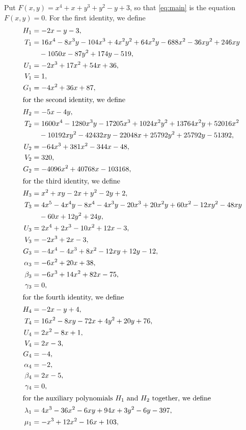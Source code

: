 \documentclass[11pt]{article}
\begin{document}
Put $F(x,y)=x^{4}+x+y^{3}+y^{2}-y+3$, so that \eqref{eq:main} is the equation $F(x,y)=0$. For the first identity, we define
\begin{align*}
H_{1}&=-2x-y-3,\\
T_{1}&=16x^{4}-8x^{3}y-104x^{3}+4x^{2}y^{2}+64x^{2}y-688x^{2}-36xy^{2}+246xy\\
&\quad-1050x-87y^{2}+174y-519,\\
U_{1}&=-2x^{3}+17x^{2}+54x+36,\\
V_{1}&=1,\\
G_{1}&=-4x^{2}+36x+87,\\
\intertext{for the second identity, we define}
H_{2}&=-5x-4y,\\
T_{2}&=1600x^{4}-1280x^{3}y-17205x^{3}+1024x^{2}y^{2}+13764x^{2}y+52016x^{2}\\
&\quad-10192xy^{2}-42432xy-22048x+25792y^{2}+25792y-51392,\\
U_{2}&=-64x^{3}+381x^{2}-344x-48,\\
V_{2}&=320,\\
G_{2}&=-4096x^{2}+40768x-103168,\\
\intertext{for the third identity, we define}
H_{3}&=x^{2}+xy-2x+y^{2}-2y+2,\\
T_{3}&=4x^{5}-4x^{4}y-8x^{4}-4x^{3}y-20x^{3}+20x^{2}y+60x^{2}-12xy^{2}-48xy\\
&\quad-60x+12y^{2}+24y,\\
U_{3}&=2x^{4}+2x^{3}-10x^{2}+12x-3,\\
V_{3}&=-2x^{3}+2x-3,\\
G_{3}&=-4x^{4}-4x^{3}+8x^{2}-12xy+12y-12,\\
\alpha_{3}&=-6x^{2}+20x+38,\\
\beta_{3}&=-6x^{3}+14x^{2}+82x-75,\\
\gamma_{3}&=0,\\
\intertext{for the fourth identity, we define}
H_{4}&=-2x-y+4,\\
T_{4}&=16x^{2}-8xy-72x+4y^{2}+20y+76,\\
U_{4}&=2x^{2}-8x+1,\\
V_{4}&=2x-3,\\
G_{4}&=-4,\\
\alpha_{4}&=-2,\\
\beta_{4}&=2x-5,\\
\gamma_{4}&=0,\\
\intertext{for the auxiliary polynomials $H_{1}$ and $H_{2}$ together, we define}
\lambda_{1}&=4x^{3}-36x^{2}-6xy+94x+3y^{2}-6y-397,\\
\mu_{1}&=-x^{3}+12x^{2}-16x+103,\\

\end{align*}
\end{document}
